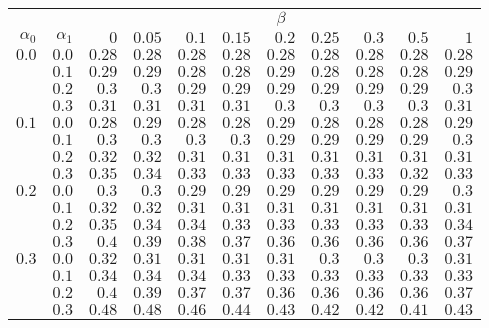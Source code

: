 \begin{tabular}{rr|rrrrrrrrr}
\hline\hline
 && \multicolumn{9}{c}{$\beta$}\\
 $\alpha_0$ & $\alpha_1$ & $0$ & $0.05$ & $0.1$ & $0.15$ & $0.2$ & $0.25$ & $0.3$ & $0.5$ & $1$ \\ 
 \hline
$0.0$ & $0.0$ & $0.28$ & $0.28$ & $0.28$ & $0.28$ & $0.28$ & $0.28$ & $0.28$ & $0.28$ & $0.28$\\ 
 & $0.1$ & $0.29$ & $0.29$ & $0.28$ & $0.28$ & $0.29$ & $0.28$ & $0.28$ & $0.28$ & $0.29$\\ 
 & $0.2$ & $0.3$ & $0.3$ & $0.29$ & $0.29$ & $0.29$ & $0.29$ & $0.29$ & $0.29$ & $0.3$\\ 
 & $0.3$ & $0.31$ & $0.31$ & $0.31$ & $0.31$ & $0.3$ & $0.3$ & $0.3$ & $0.3$ & $0.31$\\ 
\hline 
 $0.1$ & $0.0$ & $0.28$ & $0.29$ & $0.28$ & $0.28$ & $0.29$ & $0.28$ & $0.28$ & $0.28$ & $0.29$\\ 
 & $0.1$ & $0.3$ & $0.3$ & $0.3$ & $0.3$ & $0.29$ & $0.29$ & $0.29$ & $0.29$ & $0.3$\\ 
 & $0.2$ & $0.32$ & $0.32$ & $0.31$ & $0.31$ & $0.31$ & $0.31$ & $0.31$ & $0.31$ & $0.31$\\ 
 & $0.3$ & $0.35$ & $0.34$ & $0.33$ & $0.33$ & $0.33$ & $0.33$ & $0.33$ & $0.32$ & $0.33$\\ 
\hline 
 $0.2$ & $0.0$ & $0.3$ & $0.3$ & $0.29$ & $0.29$ & $0.29$ & $0.29$ & $0.29$ & $0.29$ & $0.3$\\ 
 & $0.1$ & $0.32$ & $0.32$ & $0.31$ & $0.31$ & $0.31$ & $0.31$ & $0.31$ & $0.31$ & $0.31$\\ 
 & $0.2$ & $0.35$ & $0.34$ & $0.34$ & $0.33$ & $0.33$ & $0.33$ & $0.33$ & $0.33$ & $0.34$\\ 
 & $0.3$ & $0.4$ & $0.39$ & $0.38$ & $0.37$ & $0.36$ & $0.36$ & $0.36$ & $0.36$ & $0.37$\\ 
\hline 
 $0.3$ & $0.0$ & $0.32$ & $0.31$ & $0.31$ & $0.31$ & $0.31$ & $0.3$ & $0.3$ & $0.3$ & $0.31$\\ 
 & $0.1$ & $0.34$ & $0.34$ & $0.34$ & $0.33$ & $0.33$ & $0.33$ & $0.33$ & $0.33$ & $0.33$\\ 
 & $0.2$ & $0.4$ & $0.39$ & $0.37$ & $0.37$ & $0.36$ & $0.36$ & $0.36$ & $0.36$ & $0.37$\\ 
 & $0.3$ & $0.48$ & $0.48$ & $0.46$ & $0.44$ & $0.43$ & $0.42$ & $0.42$ & $0.41$ & $0.43$\\ 
 \hline 
 \end{tabular}